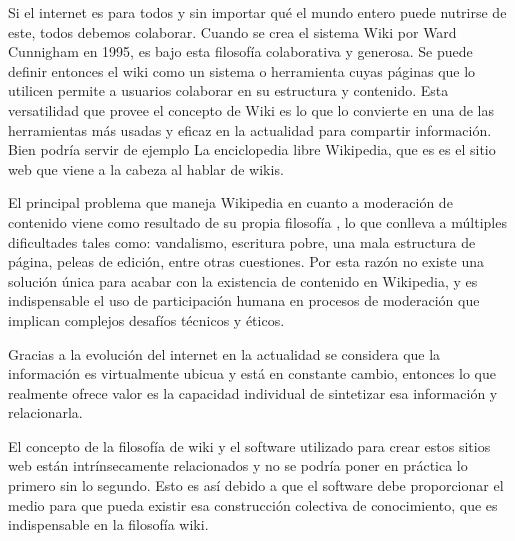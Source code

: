 

Si el internet es para todos y sin importar qué el mundo entero puede nutrirse de este, todos debemos colaborar. Cuando se crea el sistema Wiki por Ward Cunnigham en 1995, es bajo esta filosofía colaborativa y generosa. Se puede definir entonces el wiki como un sistema o herramienta cuyas páginas que lo utilicen permite a usuarios colaborar en su estructura y contenido. Esta versatilidad que provee el concepto de Wiki es lo que lo convierte en una de las herramientas más usadas y eficaz en la actualidad para compartir información. Bien podría servir de ejemplo La enciclopedia libre Wikipedia, que es es el sitio web que viene a la cabeza al hablar de wikis.

El principal problema que maneja Wikipedia en cuanto a moderación de contenido viene como resultado de su propia filosofía , lo que conlleva a múltiples dificultades tales como: vandalismo, escritura pobre, una mala estructura de página, peleas de edición, entre otras cuestiones. Por esta razón no existe una solución única para acabar con la existencia de  contenido en Wikipedia, y es indispensable el uso de participación humana en procesos de moderación que implican complejos desafíos técnicos y éticos.

Gracias a la evolución del internet en la actualidad se considera que la información es virtualmente ubicua y está en constante cambio, entonces lo que realmente ofrece valor es la capacidad individual de sintetizar esa información y relacionarla.

El concepto de la filosofía de wiki y el software utilizado para crear estos sitios web están intrínsecamente relacionados y no se podría poner en práctica lo primero sin lo segundo. Esto es así debido a que el software debe proporcionar el medio para que pueda existir esa construcción colectiva de conocimiento, que es indispensable en la filosofía wiki.



